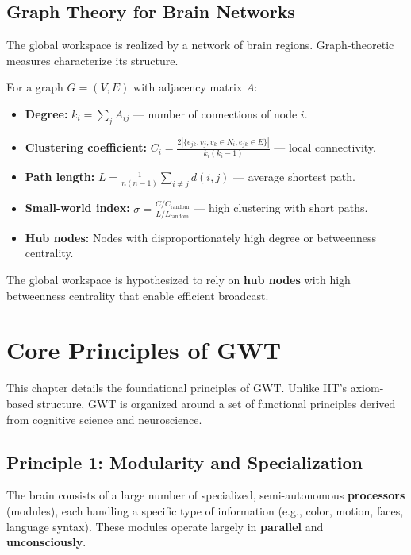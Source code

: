 \documentclass[11pt,a4paper]{report}
\begin{document}
\section{Graph Theory for Brain Networks}

The global workspace is realized by a network of brain regions. Graph-theoretic measures characterize its structure.

\begin{definitionbox}
For a graph $G = (V, E)$ with adjacency matrix $A$:
\begin{itemize}[leftmargin=1.5em]
  \item \textbf{Degree:} $k_i = \sum_j A_{ij}$ --- number of connections of node $i$.
  \item \textbf{Clustering coefficient:} $C_i = \frac{2 |\{e_{jk} : v_j, v_k \in N_i, e_{jk} \in E\}|}{k_i(k_i - 1)}$ --- local connectivity.
  \item \textbf{Path length:} $L = \frac{1}{n(n{-}1)} \sum_{i \neq j} d(i,j)$ --- average shortest path.
  \item \textbf{Small-world index:} $\sigma = \frac{C/C_{\text{random}}}{L/L_{\text{random}}}$ --- high clustering with short paths.
  \item \textbf{Hub nodes:} Nodes with disproportionately high degree or betweenness centrality.
\end{itemize}
The global workspace is hypothesized to rely on \textbf{hub nodes} with high betweenness centrality that enable efficient broadcast.
\end{definitionbox}


\chapter{Core Principles of GWT}

This chapter details the foundational principles of GWT. Unlike IIT's axiom-based structure, GWT is organized around a set of functional principles derived from cognitive science and neuroscience.

\section{Principle 1: Modularity and Specialization}

\begin{principlebox}
The brain consists of a large number of specialized, semi-autonomous \textbf{processors} (modules), each handling a specific type of information (e.g., color, motion, faces, language syntax). These modules operate largely in \textbf{parallel} and \textbf{unconsciously}.
\end{principlebox}
\end{document}
